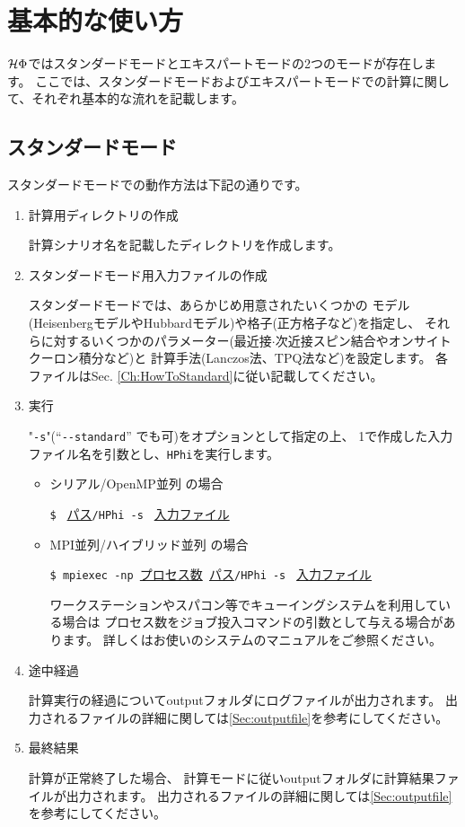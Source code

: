 \newpage
\section{基本的な使い方}
$\mathcal{H} \Phi$ではスタンダードモードとエキスパートモードの2つのモードが存在します。
ここでは、スタンダードモードおよびエキスパートモードでの計算に関して、それぞれ基本的な流れを記載します。

\subsection{スタンダードモード}
スタンダードモードでの動作方法は下記の通りです。

 \begin{enumerate}
   \item  計算用ディレクトリの作成

計算シナリオ名を記載したディレクトリを作成します。

   \item  スタンダードモード用入力ファイルの作成

スタンダードモードでは、あらかじめ用意されたいくつかの
モデル(HeisenbergモデルやHubbardモデル)や格子(正方格子など)を指定し、
それらに対するいくつかのパラメーター(最近接$\cdot$次近接スピン結合やオンサイトクーロン積分など)と
計算手法(Lanczos法、TPQ法など)を設定します。
各ファイルはSec. \ref{Ch:HowToStandard}に従い記載してください。

 \item  実行

"\verb|-s|"(``\verb|--standard|'' でも可)をオプションとして指定の上、
1で作成した入力ファイル名を引数とし、\verb|HPhi|を実行します。

\begin{itemize}
\item シリアル/OpenMP並列 の場合

  \verb|$ | \underline{パス}\verb|/HPhi -s | \underline{入力ファイル} 

\item MPI並列/ハイブリッド並列 の場合

  \verb|$ mpiexec -np |\underline{プロセス数}\verb| |\underline{パス}\verb|/HPhi -s | \underline{入力ファイル} 

  ワークステーションやスパコン等でキューイングシステムを利用している場合は
  プロセス数をジョブ投入コマンドの引数として与える場合があります。
  詳しくはお使いのシステムのマニュアルをご参照ください。

\end{itemize}

\item 途中経過

計算実行の経過についてoutputフォルダにログファイルが出力されます。
出力されるファイルの詳細に関しては\ref{Sec:outputfile}を参考にしてください。

\item 最終結果

計算が正常終了した場合、
計算モードに従いoutputフォルダに計算結果ファイルが出力されます。
出力されるファイルの詳細に関しては\ref{Sec:outputfile}を参考にしてください。
\end{enumerate}

